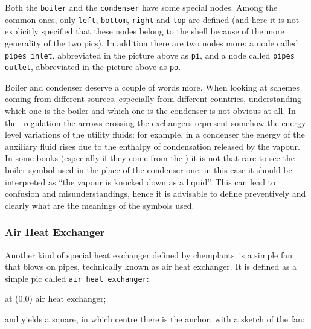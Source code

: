 \documentclass[12pt]{article}						%
\newcommand*{\ac}[1]{%
		\textsmaller{#1}%
	}
\newcommand*{\chpn}[1]{\texttt{#1}}				%
\newcommand*{\chpp}[1]{\texttt{#1}}				%
\newcommand*{\chemplants}{chemplants}
\newcommand*{\UNICHIM}{\ac{UNICHIM}}
\begin{document}
Both the \chpp{boiler} and the \chpp{condenser} have some special nodes. Among
the common ones, only \chpn{left}, \chpn{bottom}, \chpn{right} and \chpn{top} are
defined (and here it is not explicitly specified that these nodes belong to the
shell because of the more generality of the two pics). In addition there are two
nodes more: a node called \chpn{pipes inlet}, abbreviated in the picture above as
\chpn{pi}, and a node called \chpn{pipes outlet}, abbreviated in the picture
above as \chpn{po}.

Boiler and condenser deserve a couple of words more. When looking at schemes
coming from different sources, especially from different countries,
understanding which one is the boiler and which one is the condenser is not
obvious at all. In the \UNICHIM\ regulation the arrows crossing the exchangers
represent somehow the energy level variations of the utility fluids: for
example, in a condenser the energy of the auxiliary fluid rises due to the
enthalpy of condensation released by the vapour. In some books (especially if
they come from the \ac{USA}) it is not that rare to see the boiler symbol used in
the place of the condenser one: in this case it should be interpreted as ``the
vapour is knocked down as a liquid''. This can lead to confusion and
misunderstandings, hence it is advisable to define preventively and clearly what
are the meanings of the symbols used.

\subsubsection{Air Heat Exchanger}

Another kind of special heat exchanger defined by \chemplants\ is a simple fan
that blows on pipes, technically known as air heat exchanger. It is defined as
a simple pic called \chpp{air heat exchanger}:
\begin{chpcode}
	\pic at (0,0) {air heat exchanger};
\end{chpcode}
and yields a square, in which centre there is the anchor, with a sketch of the
fan:
\begin{center}
\end{center}
\end{document}
